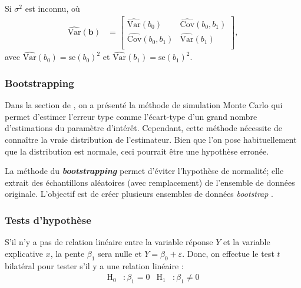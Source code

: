 \documentclass[french]{article}
\begin{document}
\begin{multicols*}{2}
\begin{definitionNOHFILL}
\bigskip

Si $\sigma^{2}$ est inconnu,  où 
\begin{align*}
	\widehat{\text{Var}}(\bm{b})
	&=	\begin{bmatrix}
		\widehat{\text{Var}}(b_{0})		&	\widehat{\text{Cov}}(b_{0}, b_{1})	\\
		\widehat{\text{Cov}}(b_{0}, b_{1})	&	\widehat{\text{Var}}(b_{1})		\\
		\end{bmatrix},
\end{align*}
avec $\widehat{\text{Var}}(b_{0}) = \text{se}(b_{0})^{2}$ et $\widehat{\text{Var}}(b_{1}) =\text{se}(b_{1})^{2}$.
\end{definitionNOHFILL}



\columnbreak
\subsubsection{Bootstrapping}
\begin{rappel_enhanced}[Contexte]
Dans la section de \textit{\underline{}}, on a présenté la méthode de simulation Monte Carlo qui permet d'estimer l'erreur type comme l'écart-type d'un grand nombre d'estimations du paramètre d'intérêt. Cependant, cette méthode nécessite de connaître la vraie distribution de l'estimateur. Bien que l'on pose habituellement que la distribution est normale, ceci pourrait être une hypothèse erronée.
\end{rappel_enhanced}

La méthode du \og \textit{\textbf{bootstrapping}} \fg{} permet d'éviter l'hypothèse de normalité; elle extrait des échantillons aléatoires (avec remplacement) de l'ensemble de données originale. L'objectif est de créer plusieurs ensembles de données \og \textit{bootstrap} \fg{}.



\columnbreak
\subsubsection{Tests d'hypothèse}
\begin{definitionNOHFILL}
S'il n'y a pas de relation linéaire entre la variable réponse $Y$ et la variable explicative $x$, la pente $\beta_{1}$ sera nulle et $Y = \beta_{0} + \varepsilon$. Donc, on effectue le test $t$ bilatéral pour tester s'il y a une relation linéaire : 
\begin{align*}
	\mathrm{H}_{0}&: \beta_{1} = 0	&
	\mathrm{H}_{1}&: \beta_{1} \neq 0
\end{align*}


\end{definitionNOHFILL}
\end{multicols*}
\end{document}

